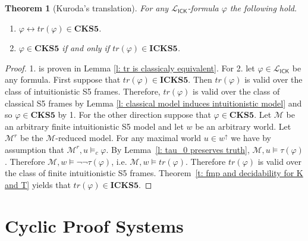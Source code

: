 \documentclass{myifcolog}
\newcommand{\ICK}{\mathsf{ICK}}
\newcommand{\LICK}{\mathcal{L}_{\ICK}}
\newcommand{\fw}{\mathcal{M}}
\newtheorem{theorem}{Theorem}
\numberwithin{theorem}{section}
\begin{document}
\begin{theorem}[Kuroda's translation]\label{t: negative translation}
    For any $\LICK$-formula $\varphi$ the following hold.
    \begin{enumerate}
        \item $\varphi \leftrightarrow tr(\varphi) \in \mathbf{CKS5}$.
        \item $\varphi \in \mathbf{CKS5}$ if and only if $tr(\varphi) \in \mathbf{ICKS5}$.
    \end{enumerate}
\end{theorem}
\begin{proof}
     1. is proven in Lemma \ref{l: tr is classicaly equivalent}. For 2. let $\varphi \in \mathcal{L}_\ICK$ be any formula. First suppose that $tr(\varphi) \in \mathbf{ICKS5}$. Then $tr(\varphi)$ is valid over the class of intuitionistic S5 frames. Therefore, $tr(\varphi)$ is valid over the class of classical S5 frames by Lemma \ref{l: classical model induces intuitionistic model} and so $\varphi \in \mathbf{CKS5}$ by 1. For the other direction suppose that $\varphi \in \mathbf{CKS5}$. Let $\fw$ be an arbitrary finite intuitionistic S5 model and let $w$ be an arbitrary world. Let $\fw^r$ be the $\fw$-reduced model. For any maximal world $u \in w^\uparrow$ we have by assumption that $\fw^r, u \models_c \varphi$. By Lemma~\ref{l: tau_0 preserves truth}, $\fw, u \models \tau(\varphi)$. Therefore $\fw,w \models \neg \neg \tau(\varphi)$, i.e. $\fw,w \models tr(\varphi)$. Therefore $tr(\varphi)$ is valid over the class of finite intuitionistic S5 frames. Theorem~\ref{t: fmp and decidability for K and T} yields that $tr(\varphi) \in  \mathbf{ICKS5}$.
\end{proof}

\section{Cyclic Proof Systems}\label{s: cyclic proof systems}
\end{document}
